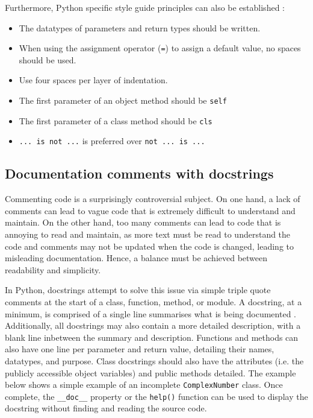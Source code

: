 \documentclass[11pt]{article}
\begin{document}
\noindent
Furthermore, Python specific style guide principles can also be established \cite{python-style}:

\begin{itemize}
    \item The datatypes of parameters and return types should be written.
    \item When using the assignment operator (\texttt{=}) to assign a default value, no spaces should be used.
    \item Use four spaces per layer of indentation.
    \item The first parameter of an object method should be \texttt{self}
    \item The first parameter of a class method should be \texttt{cls}
    \item \texttt{... is not ...} is preferred over \texttt{not ... is ...}
\end{itemize}

\subsection{Documentation comments with docstrings}

Commenting code is a surprisingly controversial subject. On one hand, a lack of comments can lead to vague code that is extremely difficult to understand and maintain. On the other hand, too many comments can lead to code that is annoying to read and maintain, as more text must be read to understand the code and comments may not be updated when the code is changed, leading to misleading documentation. Hence, a balance must be achieved between readability and simplicity.

In Python, docstrings attempt to solve this issue via simple triple quote comments at the start of a class, function, method, or module. A docstring, at a minimum, is comprised of a single line summarises what is being documented \cite{python-docstring}. Additionally, all docstrings may also contain a more detailed description, with a blank line inbetween the summary and description. Functions and methods can also have one line per parameter and return value, detailing their names, datatypes, and purpose. Class docstrings should also have the attributes (i.e. the publicly accessible object variables) and public methods detailed. The example below shows a simple example of an incomplete \texttt{ComplexNumber} class. Once complete, the \texttt{__doc__} property or the \texttt{help()} function can be used to display the docstring without finding and reading the source code.
\end{document}
